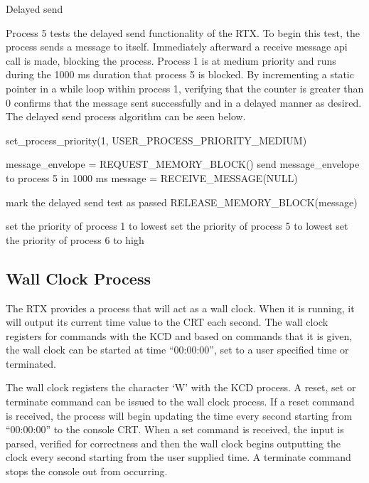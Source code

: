 \documentclass[12pt]{report}
\begin{document}
 Delayed send

\noindent Process 5 tests the delayed send functionality of the RTX. To begin this test, the process sends a message to itself. Immediately afterward a receive message api call is made, blocking the process. Process 1 is at medium priority and runs during the 1000 ms duration that process 5 is blocked. By incrementing a static pointer in a while loop within process 1, verifying that the counter is greater than 0 confirms that the message sent successfully and in a delayed manner as desired.  The delayed send process algorithm can be seen below.

\begin{algorithmic}
  \State set\_process\_priority(1, USER\_PROCESS\_PRIORITY\_MEDIUM)

  \State message\_envelope = REQUEST\_MEMORY\_BLOCK()
  \State send message\_envelope to process 5 in 1000 ms
  \State message = RECEIVE\_MESSAGE(NULL)

    \State mark the delayed send test as passed
  \EndIf
  \State RELEASE\_MEMORY\_BLOCK(message)

  \State set the priority of process 1 to lowest
  \State set the priority of process 5 to lowest
  \State set the priority of process 6 to high
  \EndWhile
\EndFunction
\end{algorithmic}

\subsection{Wall Clock Process}
\label{sec:wall_clock_process}
    The RTX provides a process that will act as a wall clock. When it is running, it will output its current time value to the CRT each second. The wall clock registers for commands with the KCD and based on commands that it is given, the wall clock can be started at time “00:00:00”, set to a user specified time or terminated.

  The wall clock registers the character ‘W’ with the KCD process. A reset, set or terminate command can be issued to the wall clock process. If a reset command is received, the process will begin updating the time every second starting from “00:00:00” to the console CRT. When a set command is received, the input is parsed, verified for correctness and then the wall clock begins outputting the clock every second starting from the user supplied time. A terminate command stops the console out from occurring.
\end{document}
